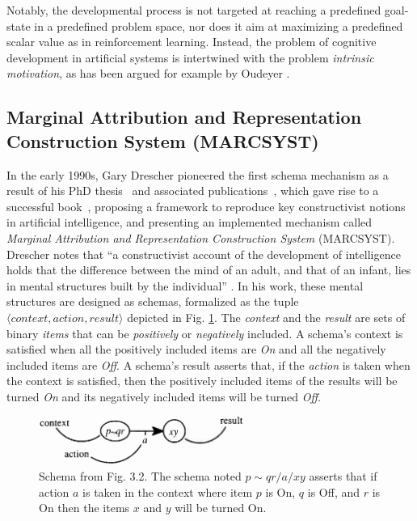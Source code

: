\documentclass[runningheads]{llncs}
\begin{document}
Notably, the developmental process is not targeted at reaching a predefined goal-state in a predefined problem space, nor does it aim at maximizing a predefined scalar value as in reinforcement learning.
Instead, the problem of cognitive development in artificial systems is intertwined with the problem \textit{intrinsic motivation}, as has been argued for example by  
Oudeyer \cite{oudeyer_intrinsic_2007}. 


\subsection{Marginal Attribution and Representation Construction System (MARCSYST)}

In the early 1990s, Gary Drescher pioneered the first schema mechanism as a result of his PhD thesis~\cite{Drescher:1989} and associated publications~\cite{Drescher:1987,Drescher:1993}, which gave rise to a successful book~\cite{drescher_made-up_1991}, proposing a framework to reproduce key constructivist notions in artificial intelligence, and presenting an implemented mechanism called \textit{Marginal Attribution and Representation Construction System} (MARCSYST).
Drescher notes that ``a constructivist account of the development of intelligence holds that the difference between the mind of an adult, and that of an infant, lies in mental structures built by the individual'' \cite[p. 41]{drescher_made-up_1991}.
In his work, these mental structures are designed as schemas, formalized as the tuple $\langle \textit{context}, \textit{action}, \textit{result} \rangle$ depicted in Fig. \ref{fig:drescher}.
The \textit{context} and the \textit{result} are sets of binary \textit{items} that can be \textit{positively} or \textit{negatively} included. 
A schema's context is satisfied when all the positively included items are \textit{On} and all the negatively included items are \textit{Off}. 
A schema's result asserts that, if the \textit{action} is taken when the context is satisfied, then the positively included items of the results will be turned \textit{On} and its negatively included items will be turned \textit{Off}.

\begin{figure}
	\centering
	\includegraphics[width=0.6\textwidth]{Figure_2_schema_drescher.png}
	\caption{Schema from \cite{drescher_made-up_1991} Fig. 3.2.
		The schema noted $p \!\sim\! qr/a/xy$ asserts that if action $a$ is taken in the context where item $p$ is On, $q$ is Off, and $r$ is On then the items $x$ and $y$ will be turned On.} 
	\label{fig:drescher}
\end{figure}
\end{document}
